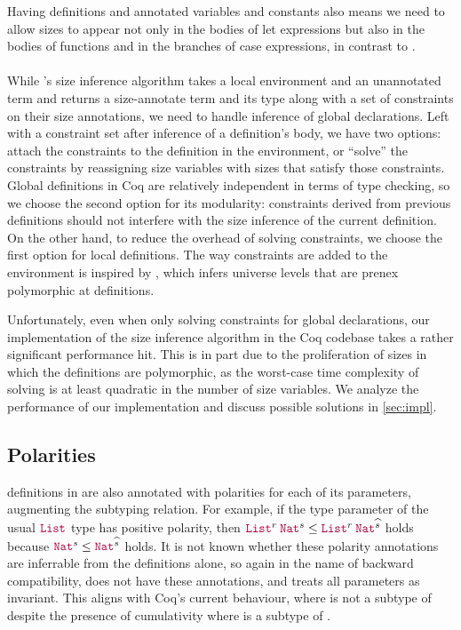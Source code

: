 Having definitions and annotated variables and constants also means we need to allow sizes to appear
not only in the bodies of let expressions but also in the bodies of functions and in the branches of case expressions,
in contrast to \CIChatminus.

\paragraph*{} While \CIChat's size inference algorithm takes a local environment and an unannotated term
and returns a size-annotate term and its type along with a set of constraints on their size annotations,
we need to handle inference of global declarations.
Left with a constraint set after inference of a definition's body, we have two options:
attach the constraints to the definition in the environment,
or ``solve'' the constraints by reassigning size variables with sizes that satisfy those constraints.
Global definitions in Coq are relatively independent in terms of type checking,
so we choose the second option for its modularity:
constraints derived from previous definitions should not interfere with the size inference of the current definition.
On the other hand, to reduce the overhead of solving constraints,
we choose the first option for local definitions.
The way constraints are added to the environment is inspired by \citet{universes},
which infers universe levels that are prenex polymorphic at definitions.

Unfortunately, even when only solving constraints for global declarations,
our implementation of the size inference algorithm in the Coq codebase takes a rather significant performance hit.
This is in part due to the proliferation of sizes in which the definitions are polymorphic,
as the worst-case time complexity of solving is at least quadratic in the number of size variables.
We analyze the performance of our implementation and discuss possible solutions in \autoref{sec:impl}.

\subsection{Polarities}

\Coinductive definitions in \CIChatminus are also annotated with polarities for each of its parameters, augmenting the subtyping relation.
For example, if the type parameter of the usual $\List$ type has positive polarity,
then $\app{\List^r}{\Nat^s} \leq \app{\List^r}{\Nat^{\succ{s}}}$ holds
because $\Nat^s \leq \Nat^{\succ{s}}$ holds.
It is not known whether these polarity annotations are inferrable from the \coinductive definitions alone,
so again in the name of backward compatibility, \lang does not have these annotations,
and treats all parameters as invariant.
This aligns with Coq's current behaviour, where  is not a subtype of 
despite the presence of cumulativity where  is a subtype of .

